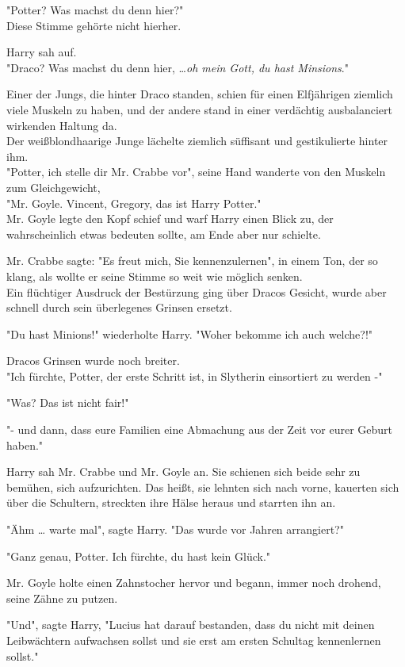 {"Potter? Was machst du denn hier?"\\ Diese Stimme gehörte nicht hierher.

Harry sah auf.\\ "Draco? Was machst du denn hier, …\emph{oh mein Gott, du hast Minsions}."

Einer der Jungs, die hinter Draco standen, schien für einen Elfjährigen ziemlich viele Muskeln zu haben, und der andere stand in einer verdächtig ausbalanciert wirkenden Haltung da.\\ Der weißblondhaarige Junge lächelte ziemlich süffisant und gestikulierte hinter ihm.\\ "Potter, ich stelle dir Mr. Crabbe vor", seine Hand wanderte von den Muskeln zum Gleichgewicht,\\ "Mr. Goyle. Vincent, Gregory, das ist Harry Potter."\\ Mr. Goyle legte den Kopf schief und warf Harry einen Blick zu, der wahrscheinlich etwas bedeuten sollte, am Ende aber nur schielte.

Mr. Crabbe sagte: "Es freut mich, Sie kennenzulernen", in einem Ton, der so klang, als wollte er seine Stimme so weit wie möglich senken.\\ Ein flüchtiger Ausdruck der Bestürzung ging über Dracos Gesicht, wurde aber schnell durch sein überlegenes Grinsen ersetzt.

"Du hast Minions!" wiederholte Harry. "Woher bekomme ich auch welche?!"

Dracos Grinsen wurde noch breiter.\\ "Ich fürchte, Potter, der erste Schritt ist, in Slytherin einsortiert zu werden -"

"Was? Das ist nicht fair!"

"- und dann, dass eure Familien eine Abmachung aus der Zeit vor eurer Geburt haben."

Harry sah Mr. Crabbe und Mr. Goyle an. Sie schienen sich beide sehr zu bemühen, sich aufzurichten. Das heißt, sie lehnten sich nach vorne, kauerten sich über die Schultern, streckten ihre Hälse heraus und starrten ihn an.

"Ähm … warte mal", sagte Harry. "Das wurde vor Jahren arrangiert?"

"Ganz genau, Potter. Ich fürchte, du hast kein Glück."

Mr. Goyle holte einen Zahnstocher hervor und begann, immer noch drohend, seine Zähne zu putzen.

"Und", sagte Harry, "Lucius hat darauf bestanden, dass du nicht mit deinen Leibwächtern aufwachsen sollst und sie erst am ersten Schultag kennenlernen sollst."

}
